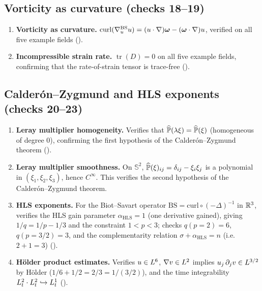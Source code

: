 \subsection{Vorticity as curvature (checks 18--19)}\label{sec:sympy-ch03-vort}

\begin{enumerate}[resume,label=(\roman*)]
  \item \textbf{Vorticity as curvature.}
    $\operatorname{curl}(\nabla^{\mathrm{BS}}_u u) = (u\cdot\nabla)\boldsymbol{\omega} - (\boldsymbol{\omega}\cdot\nabla)u$,
    verified on all five example fields ().

  \item \textbf{Incompressible strain rate.}
    $\operatorname{tr}(D) = 0$ on all five example fields, confirming that the
    rate-of-strain tensor is trace-free ().
\end{enumerate}

\subsection{Calder\'{o}n--Zygmund and HLS exponents (checks 20--23)}\label{sec:sympy-ch03-cz}

\begin{enumerate}[resume,label=(\roman*)]
  \item \textbf{Leray multiplier homogeneity.}
    Verifies that $\widehat{\mathbb{P}}(\lambda\xi) = \widehat{\mathbb{P}}(\xi)$
    (homogeneous of degree $0$), confirming the first hypothesis of the
    Calder\'{o}n--Zygmund theorem ().

  \item \textbf{Leray multiplier smoothness.}
    On $\mathbb{S}^2$, $\widehat{\mathbb{P}}(\xi)_{ij} = \delta_{ij} - \xi_i\xi_j$ is
    a polynomial in $(\xi_1,\xi_2,\xi_3)$, hence $C^\infty$.  This verifies the
    second hypothesis of the Calder\'{o}n--Zygmund theorem.

  \item \textbf{HLS exponents.}
    For the Biot--Savart operator $\mathrm{BS} = \mathrm{curl} \circ (-\Delta)^{-1}$
    in $\mathbb{R}^{3}$, verifies the HLS gain parameter $\alpha_{\mathrm{HLS}} = 1$ (one
    derivative gained), giving $1/q = 1/p - 1/3$ and the constraint $1 < p < 3$;
    checks $q(p=2) = 6$, $q(p=3/2) = 3$, and the complementarity relation
    $\sigma + \alpha_{\mathrm{HLS}} = n$ (i.e.\ $2 + 1 = 3$)
    ().

  \item \textbf{H\"{o}lder product estimates.}
    Verifies $u \in L^{6}$, $\nabla v \in L^{2}$ implies
    $u_j\,\partial_j v \in L^{3/2}$ by H\"{o}lder
    ($1/6 + 1/2 = 2/3 = 1/(3/2)$), and the time integrability
    $L^{2}_t \cdot L^{2}_t \hookrightarrow L^{1}_t$
    ().
\end{enumerate}
